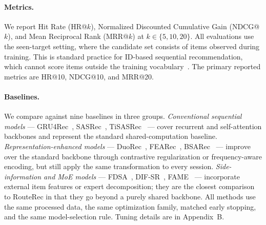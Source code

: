 \documentclass[sigconf,review,anonymous]{acmart}
\begin{document}
\paragraph{Metrics.}
We report Hit Rate (HR@$k$), Normalized Discounted Cumulative Gain (NDCG@$k$), and Mean Reciprocal Rank (MRR@$k$) at $k \in \{5, 10, 20\}$. All evaluations use the seen-target setting, where the candidate set consists of items observed during training. This is standard practice for ID-based sequential recommendation, which cannot score items outside the training vocabulary~\cite{latifi2021sessionaware}. The primary reported metrics are HR@10, NDCG@10, and MRR@20.

\paragraph{Baselines.}
We compare against nine baselines in three groups.
\textit{Conventional sequential models} --- GRU4Rec~\cite{hidasi2016gru4rec}, SASRec~\cite{kang2018sasrec}, TiSASRec~\cite{li2020tisasrec} --- cover recurrent and self-attention backbones and represent the standard shared-computation baseline.
\textit{Representation-enhanced models} --- DuoRec~\cite{qiu2022duorec}, FEARec~\cite{du2023fearec}, BSARec~\cite{shin2024bsarec} --- improve over the standard backbone through contrastive regularization or frequency-aware encoding, but still apply the same transformation to every session.
\textit{Side-information and MoE models} --- FDSA~\cite{zhang2019fdsa}, DIF-SR~\cite{xie2022difsr}, FAME~\cite{liu2025fame} --- incorporate external item features or expert decomposition; they are the closest comparison to RouteRec in that they go beyond a purely shared backbone.
All methods use the same processed data, the same optimization family, matched early stopping, and the same model-selection rule. Tuning details are in Appendix~B.
\end{document}
